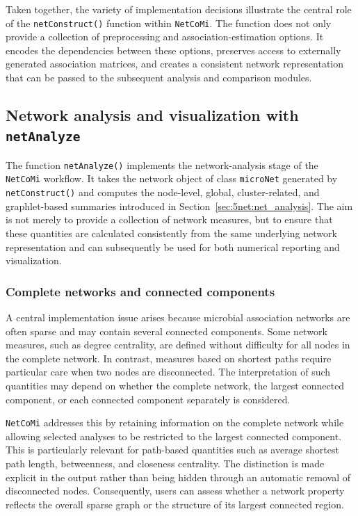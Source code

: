 Taken together, the variety of implementation decisions illustrate the central role of the \texttt{netConstruct()} function within \texttt{NetCoMi}. The function does not only provide a collection of preprocessing and association-estimation options. It encodes the dependencies between these options, preserves access to externally generated association matrices, and creates a consistent network representation that can be passed to the subsequent analysis and comparison modules.


\subsection{Network analysis and visualization with \texttt{netAnalyze}}
\label{sec:5net:workflow_implementation:netanalyze}


The function \texttt{netAnalyze()} implements the network-analysis stage of the \texttt{NetCoMi} workflow. It takes the network object of class \texttt{microNet} generated by \texttt{netConstruct()} and computes the node-level, global, cluster-related, and graphlet-based summaries introduced in Section~\ref{sec:5net:net_analysis}. The aim is not merely to provide a collection of network measures, but to ensure that these quantities are calculated consistently from the same underlying network representation and can subsequently be used for both numerical reporting and visualization.

\subsubsection{Complete networks and connected components}

A central implementation issue arises because microbial association networks are often sparse and may contain several connected components. Some network measures, such as degree centrality, are defined without difficulty for all nodes in the complete network. In contrast, measures based on shortest paths require particular care when two nodes are disconnected. The interpretation of such quantities may depend on whether the complete network, the largest connected component, or each connected component separately is considered.

\texttt{NetCoMi} addresses this by retaining information on the complete network while allowing selected analyses to be restricted to the largest connected component. This is particularly relevant for path-based quantities such as average shortest path length, betweenness, and closeness centrality. The distinction is made explicit in the output rather than being hidden through an automatic removal of disconnected nodes. Consequently, users can assess whether a network property reflects the overall sparse graph or the structure of its largest connected region.

